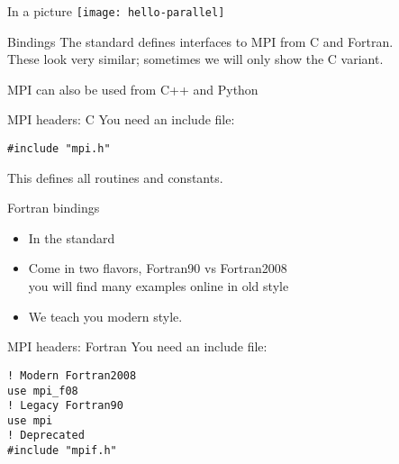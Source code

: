 \begin{exerciseframe}[hello]
  
\end{exerciseframe}

\begin{numberedframe}{In a picture}
  \texttt{[image: hello-parallel]}
\end{numberedframe}


\begin{numberedframe}{Bindings}
  The standard defines interfaces to MPI
  from C and Fortran.\\
  These look very similar;
  sometimes we will only show the C variant.

  MPI can also be used from C++ and Python
\end{numberedframe}

\begin{numberedframe}{MPI headers: C}
\label{sl:mpi-header-c}
You need an include file:
\begin{verbatim}
#include "mpi.h"
\end{verbatim}
This defines all routines and constants.
\end{numberedframe}

\begin{fortran}
  \addtocounter{slidecount}{-2}
\begin{numberedframe}{Fortran bindings}
    \begin{itemize}
    \item
      In the standard
    \item Come in two flavors, Fortran90 vs Fortran2008\\
      you will find many examples online in old style
    \item We teach you modern style.
    \end{itemize}
\end{numberedframe}

\begin{numberedframe}{MPI headers: Fortran}
    \label{sl:mpi-header-f}
    You need an include file:
\begin{verbatim}
! Modern Fortran2008
use mpi_f08
! Legacy Fortran90
use mpi       
! Deprecated
#include "mpif.h"
\end{verbatim}
\end{numberedframe}
\end{fortran}

